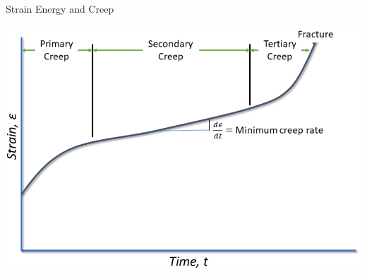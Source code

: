 \documentclass{beamer}
\begin{document}
\begin{frame}{Strain Energy and Creep}
\begin{minipage}[t]{0.45\textwidth}
        \includegraphics[width=\textwidth]{Creep2.png}
    \end{minipage}
\end{frame}

\end{document}
